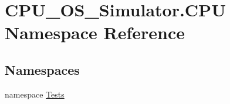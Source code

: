 \hypertarget{namespace_c_p_u___o_s___simulator_1_1_c_p_u}{}\section{C\+P\+U\+\_\+\+O\+S\+\_\+\+Simulator.\+C\+P\+U Namespace Reference}
\label{namespace_c_p_u___o_s___simulator_1_1_c_p_u}
\subsection*{Namespaces}
\begin{DoxyCompactItemize}
\item 
namespace \hyperlink{namespace_c_p_u___o_s___simulator_1_1_c_p_u_1_1_tests}{Tests}
\end{DoxyCompactItemize}
